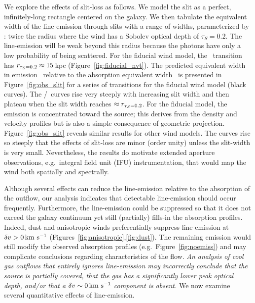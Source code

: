 \documentclass[]{emulateapj}
\begin{document}
We explore the effects of slit-loss as follows.
We model the slit as a perfect, infinitely-long rectangle centered on the
galaxy.  We then tabulate the equivalent width of the line-emission
through slits with a range of widths, parameterized by \rtt: twice the radius
where the wind has a Sobolev optical depth of $\tau_S = 0.2$. 
The line-emission will be weak beyond
this radius because the photons have only a low probability of
being scattered.  For the fiducial wind model, 
the \mgiia\ transition has $r_{\tau_S = 0.2} \approx 15$\,kpc 
(Figure~\ref{fig:fiducial_nvt}).  
The predicted equivalent width in emission \ewe\ relative to the absorption
equivalent width \ewabs\ is presented in
Figure~\ref{fig:obs_slit} for a series of transitions for the fiducial
wind model (black curves).
The \ewe/\ewabs\ curves rise very steeply with increasing slit width and then
plateau when the slit width reaches $\approx r_{\tau_S = 0.2}$.  
For the fiducial model, the emission is concentrated toward the source; this
derives from the density and velocity profiles but is also a simple
consequence of geometric projection.
Figure~\ref{fig:obs_slit} reveals similar results for other wind
models. The curves rise so steeply that 
the effects of slit-loss are minor (order unity)
unless the slit-width is very small.   
Nevertheless, the results do motivate
extended aperture observations, e.g.\ integral field unit (IFU)
instrumentation, that would map the wind both spatially and spectrally.


Although several effects can reduce the line-emission
relative to the absorption of the outflow, our analysis
indicates that detectable line-emission should occur frequently. 
Furthermore, the line-emission could be suppressed so %
that it does not
exceed
the galaxy continuum yet still (partially) fills-in the absorption
profiles. Indeed, dust and anisotropic winds preferentially suppress
line-emission at $\delta v > 0 \, {\rm km~s^{-1}}$
(Figures~\ref{fig:anisotropic},\ref{fig:dust}).
The remaining emission would still 
modify the observed absorption profiles (e.g.\
Figure~\ref{fig:noemiss}) and may complicate conclusions
regarding characteristics of the flow.  {\it An analysis of cool gas outflows
that entirely ignores line-emission may incorrectly conclude that the source is
partially covered, that the gas has a significantly lower peak optical depth,
and/or that a $\delta v \sim 0 \, {\rm km~s^{-1}}$ component is
absent.}  
We now examine several quantitative effects of line-emission.
\end{document}
